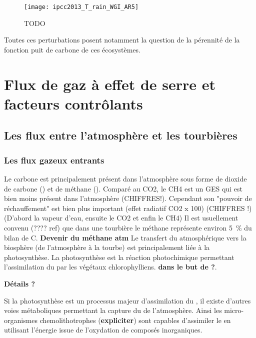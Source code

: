 \begin{figure}
\centering
\texttt{[image: ipcc2013\_T\_rain\_WGI\_AR5]}
\caption{TODO}
\label{fig:ipcc2013_T_rain}
\end{figure}

Toutes ces perturbations posent notamment la question de la pérennité de la fonction puit de carbone de ces écosystèmes.


\section{Flux de gaz à effet de serre et facteurs contrôlants}

\subsection{Les flux entre l'atmosphère et les tourbières}

\subsubsection{Les flux gazeux entrants}

Le carbone est principalement présent dans l'atmosphère sous forme de dioxide de carbone (\coo) et de méthane (\chh).
Comparé au CO2, le CH4 est un GES qui est bien moins présent dans l'atmosphère (CHIFFRES!).
Cependant son "pouvoir de réchauffement" est bien plus important (effet radiatif CO2 x 100) (CHIFFRES !) (D'abord la vapeur d'eau, ensuite le CO2 et enfin le CH4)
Il est usuellement convenu (???? ref) que dans une tourbière le méthane représente environ \SI{5}{\percent} du bilan de C.
\textbf{Devenir du méthane atm}
Le transfert du \coo atmosphérique vers la biosphère (de l'atmosphère à la tourbe) est principalement \plop liée à la photosynthèse.
La photosynthèse est la réaction photochimique permettant l'assimilation du \coo par les végétaux chlorophylliens.
\textbf{dans le but de ?}.

\textbf{Détails ?}

Si la photosynthèse est un processus majeur d'assimilation du \coo, il existe d'autres voies métaboliques permettant la capture du \coo de l'atmosphère.
Ainsi les micro-organismes chemolithotrophes (\textbf{expliciter}) sont capables d'assimiler le \coo en utilisant l'énergie issue de l'oxydation de composés inorganiques.

